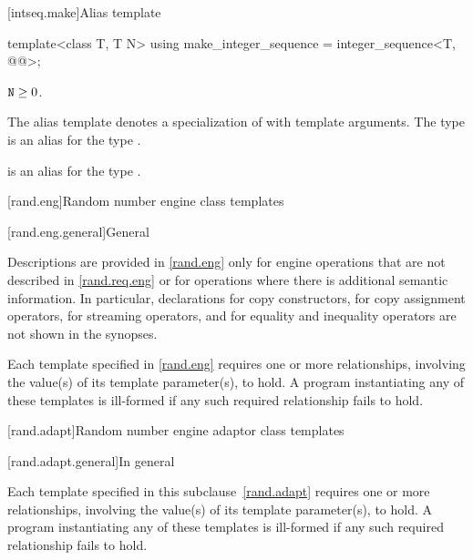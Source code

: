 \documentclass{wg21}
\begin{document}

[intseq.make]{Alias template }

%
\begin{itemdecl}
    template<class T, T N>
    using make_integer_sequence = integer_sequence<T, @\seebelow{}@>;
\end{itemdecl}

\begin{itemdescr}
    \pnum
    \mandates
    $\texttt{N} \geq 0$.

    \pnum
    The alias template
     denotes a specialization of
     with   template arguments.
    The type  is an alias for the type
    .
    \begin{note}
         is an alias for the type
        .
    \end{note}
\end{itemdescr}

[rand.eng]{Random number engine class templates}%

[rand.eng.general]{General}%

\pnum
Descriptions are provided in \ref{rand.eng}
only for engine operations
that are not described in \ref{rand.req.eng}
or for operations where there is additional semantic information.
In particular,
declarations for copy constructors,
for copy assignment operators,
for streaming operators,
and for equality and inequality operators
are not shown in the synopses.

\pnum
Each template specified in \ref{rand.eng}
requires one or more relationships,
involving the value(s) of its  template parameter(s), to hold.
A program instantiating any of these templates
is ill-formed
if any such required relationship fails to hold.

[rand.adapt]{Random number engine adaptor class templates}

[rand.adapt.general]{In general}

\pnum
Each template specified in this subclause~\ref{rand.adapt}
requires one or more relationships,
involving the value(s) of its  template parameter(s), to hold.
A program instantiating any of these templates
is ill-formed
if any such required relationship fails to hold.
\end{document}

